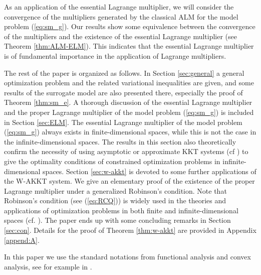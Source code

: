 \documentclass[leqno]{amsart}
\theoremstyle{definition}
\begin{document}
As an application of the essential Lagrange multiplier, we will consider the convergence of the multipliers generated by the classical ALM for the model problem (\ref{eq:sm_g}). Our results show some equivalence between the convergence of the multipliers and the existence of the essential Lagrange multiplier (see Theorem \ref{thm:ALM-ELM}). This indicates that the essential Lagrange multiplier is of fundamental importance in the application of Lagrange multipliers.

The rest of the paper is organized as follows. In Section \ref{sec:general} a general optimization problem and the related variational inequalities are given, and some results of the surrogate model are also presented there, especially the proof of Theorem \ref{thm:sm_e}. A thorough discussion of the essential Lagrange multiplier and the proper Lagrange multiplier of the model problem (\ref{eq:sm_g}) is included in Section \ref{sec:ELM}. The essential Lagrange multiplier of the model problem (\ref{eq:sm_g}) always exists in finite-dimensional spaces, while this is not the case in the infinite-dimensional spaces. The results in this section also theoretically confirm the necessity of using asymptotic or approximate KKT systems (cf \cite{andreani2019sequential, borgens2020new, jeyakumar2003new, thibault1997sequential}) to give the optimality conditions of constrained optimization problems in infinite-dimensional spaces. Section \ref{sec:w-akkt} is devoted to some further applications of the W-AKKT system. We give an elementary proof of the existence of the proper Lagrange  multiplier under a generalized Robinson's condition. Note that Robinson's condition  (see (\ref{eq:RCQ})) is widely used in the theories and applications of optimization problems in both finite and infinite-dimensional spaces (cf. \cite{ito2008lagrange, mangasarian1967fritz, maurer1979first, robinson1976stability, zowe1979regularity}). The paper ends up with some concluding remarks in Section \ref{sec:con}. Details for the proof of Theorem \ref{thm:w-akkt} are provided in Appendix \ref{append:A}. %

In this paper we use the standard notations from functional analysis and convex analysis, see for example in \cite{barbu2012convexity, bauschke2011convex, conway2007course, rockafellar1997convex, yosida2012functional}. %
\end{document}
